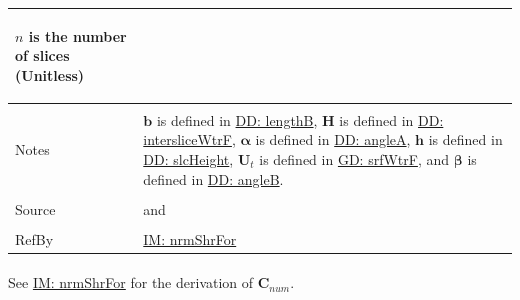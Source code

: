 \documentclass[12pt]{article}
\begin{document}
\begin{minipage}{\textwidth}
\begin{tabular}{>{\raggedright}p{}>{\raggedright\arraybackslash}p{}}
\begin{symbDescription}
              \item{$n$ is the number of slices (Unitless)}
              \end{symbDescription}
\\ \midrule \\
Notes & $\mathbf{b}$ is defined in \hyperref[DD:lengthB]{DD: lengthB}, $\mathbf{H}$ is defined in \hyperref[DD:intersliceWtrF]{DD: intersliceWtrF}, $\mathbf{α}$ is defined in \hyperref[DD:angleA]{DD: angleA}, $\mathbf{h}$ is defined in \hyperref[DD:slcHeight]{DD: slcHeight}, ${\mathbf{U}_{t}}$ is defined in \hyperref[GD:srfWtrF]{GD: srfWtrF}, and $\mathbf{β}$ is defined in \hyperref[DD:angleB]{DD: angleB}.
        
\\ \midrule \\
Source & \cite{chen2005} and \cite{karchewski2012}
         
\\ \midrule \\
RefBy & \hyperref[IM:nrmShrFor]{IM: nrmShrFor}
        
\\ \bottomrule
\end{tabular}
\end{minipage}
\paragraph{}
\label{IM:nrmShrForNumDeriv}
See \hyperref[IM:nrmShrFor]{IM: nrmShrFor} for the derivation of ${\mathbf{C}_{num}}$.
\end{document}
